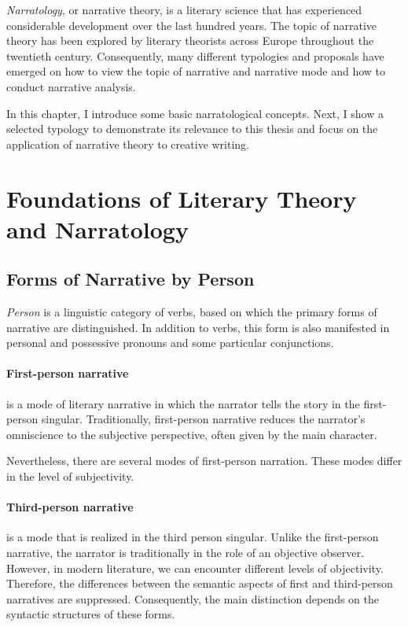 \emph{Narratology}, or narrative theory, is a literary science that has experienced considerable development over the last hundred years. The topic of narrative theory has been explored by literary theorists across Europe throughout the twentieth century. Consequently, many different typologies and proposals have emerged on how to view the topic of narrative and narrative mode and how to conduct narrative analysis. \cite{kubicek-vypravec}

In this chapter, I introduce some basic narratological concepts. Next, I show a selected typology to demonstrate its relevance to this thesis and focus on the application of narrative theory to creative writing.

\section{Foundations of Literary Theory and Narratology}


\subsection{Forms of Narrative by Person}

\emph{Person} is a linguistic category of verbs, based on which the primary forms of narrative are distinguished. In addition to verbs, this form is also manifested in personal and possessive pronouns and some particular conjunctions.

\paragraph{First-person narrative} is a mode of literary narrative in which the narrator tells the story in the first-person singular. Traditionally, first-person narrative reduces the narrator's omniscience to the subjective perspective, often given by the main character.\cite{vlasin-slovnik}

Nevertheless, there are several modes of first-person narration. These modes differ in the level of subjectivity. \cite{dolezel-narativni-zpusoby}

\paragraph{Third-person narrative} is a mode that is realized in the third person singular. Unlike the first-person narrative, the narrator is traditionally in the role of an objective observer. However, in modern literature, we can encounter different levels of objectivity. Therefore, the differences between the semantic aspects of first and third-person narratives are suppressed. Consequently, the main distinction depends on the syntactic structures of these forms. \cite{vlasin-slovnik}

